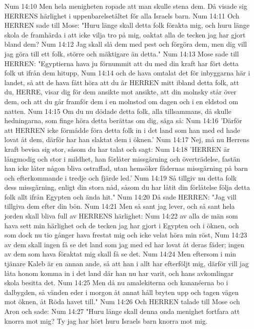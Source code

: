 Num 14:10  Men hela menigheten ropade att man skulle stena dem. Då visade sig HERRENS härlighet i uppenbarelsetältet för alla Israels barn.
Num 14:11  Och HERREN sade till Mose: "Huru länge skall detta folk förakta mig, och huru länge skola de framhärda i att icke vilja tro på mig, oaktat alla de tecken jag har gjort bland dem?
Num 14:12  Jag skall slå dem med pest och förgöra dem, men dig vill jag göra till ett folk, större och mäktigare än detta."
Num 14:13  Mose sade till HERREN: "Egyptierna hava ju förnummit att du med din kraft har fört detta folk ut ifrån dem hitupp,
Num 14:14  och de hava omtalat det för inbyggarna här i landet, så att de hava fått höra att du är HERREN mitt ibland detta folk, att du, HERRE, visar dig för dem ansikte mot ansikte, att din molnsky står över dem, och att du går framför dem i en molnstod om dagen och i en eldstod om natten.
Num 14:15  Om du nu dödade detta folk, alla tillsammans, då skulle hedningarna, som finge höra detta berättas om dig, säga så:
Num 14:16  'Därför att HERREN icke förmådde föra detta folk in i det land som han med ed hade lovat åt dem, därför har han slaktat dem i öknen.'
Num 14:17  Nej, må nu Herrens kraft bevisa sig stor, såsom du har talat och sagt:
Num 14:18  'HERREN är långmodig och stor i mildhet, han förlåter missgärning och överträdelse, fastän han icke låter någon bliva ostraffad, utan hemsöker fädernas missgärning på barn och efterkommande i tredje och fjärde led.'
Num 14:19  Så tillgiv nu detta folk dess missgärning, enligt din stora nåd, såsom du har låtit din förlåtelse följa detta folk allt ifrån Egypten och ända hit."
Num 14:20  Då sade HERREN: "Jag vill tillgiva dem efter din bön.
Num 14:21  Men så sant jag lever, och så sant hela jorden skall bliva full av HERRENS härlighet:
Num 14:22  av alla de män som hava sett min härlighet och de tecken jag har gjort i Egypten och i öknen, och som dock nu tio gånger hava frestat mig och icke velat höra min röst,
Num 14:23  av dem skall ingen få se det land som jag med ed har lovat åt deras fäder; ingen av dem som hava föraktat mig skall få se det.
Num 14:24  Men eftersom i min tjänare Kaleb är en annan ande, så att han i allt har efterföljt mig, därför vill jag låta honom komma in i det land där han nu har varit, och hans avkomlingar skola besitta det.
Num 14:25  Men då nu amalekiterna och kananéerna bo i dalbygden, så vänden eder i morgon åt annat håll bryten upp och tagen vägen mot öknen, åt Röda havet till."
Num 14:26  Och HERREN talade till Mose och Aron och sade:
Num 14:27  "Huru länge skall denna onda menighet fortfara att knorra mot mig? Ty jag har hört huru Israels barn knorra mot mig.
